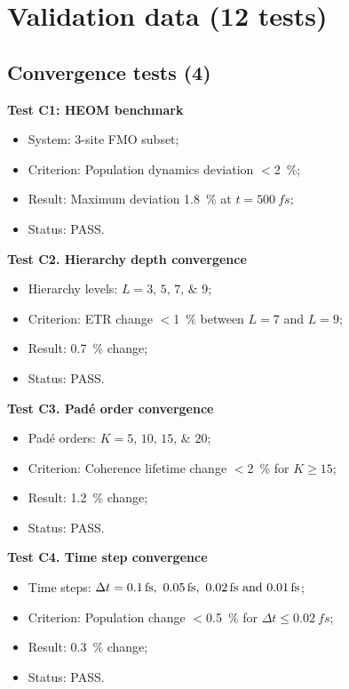 \documentclass[11pt,a4paper]{article}
\begin{document}
\section{Validation data (12 tests)}\label{si:validation}

\subsection{Convergence tests (4)}

\textbf{Test C1: HEOM benchmark}
\begin{itemize}
    \item System: 3-site FMO subset;
    \item Criterion: Population dynamics deviation $<$\SI{2}{\percent};
    \item Result: Maximum deviation \SI{1.8}{\percent} at $t = \SI{500}{fs}$;
    \item Status: PASS.
\end{itemize}

\textbf{Test C2. Hierarchy depth convergence}
\begin{itemize}
    \item Hierarchy levels: $L = \numlist{3; 5; 7; 9}$;
    \item Criterion: ETR change $<$\SI{1}{\percent} between $L=7$ and $L=9$;
    \item Result: \SI{0.7}{\percent} change;
    \item Status: PASS.
\end{itemize}

\textbf{Test C3. Pad\'e order convergence}
\begin{itemize}
    \item Pad\'e orders: $K = \numlist{5; 10; 15; 20}$;
    \item Criterion: Coherence lifetime change $<$\SI{2}{\percent} for $K \geq 15$;
    \item Result: \SI{1.2}{\percent} change;
    \item Status: PASS.
\end{itemize}

\textbf{Test C4. Time step convergence}
\begin{itemize}
    \item Time steps: $\Delta t = \SIlist{0.1; 0.05; 0.02; 0.01}{fs}$;
    \item Criterion: Population change $<$\SI{0.5}{\percent} for $\Delta t \leq \SI{0.02}{fs}$;
    \item Result: \SI{0.3}{\percent} change;
    \item Status: PASS.
\end{itemize}
\end{document}
